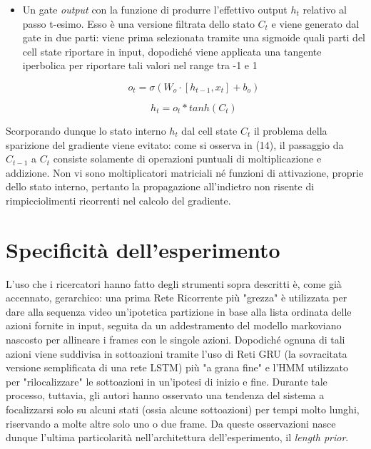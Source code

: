 \documentclass[10pt,letterpaper]{article}
\begin{document}
\begin{itemize}
\item Un gate \textit{output} con la funzione di produrre l'effettivo output $h_t$ relativo al passo t-esimo. Esso è una versione filtrata dello stato $C_t$ e viene generato dal gate in due parti: viene prima selezionata tramite una sigmoide quali parti del cell state riportare in input, dopodiché viene applicata una tangente iperbolica per riportare tali valori nel range tra -1 e 1

\begin{equation}
o_t = \sigma(W_o \cdot [h_{t-1},x_t] + b_o)
\end{equation}

\begin{equation}
h_t = o_t * tanh(C_t)
\end{equation}

\end{itemize}

Scorporando dunque lo stato interno $h_t$ dal cell state $C_t$ il problema della sparizione del gradiente viene evitato: come si osserva in (14), il passaggio da $C_{t-1}$ a $C_t$ consiste solamente di operazioni puntuali di moltiplicazione e addizione. Non vi sono moltiplicatori matriciali né funzioni di attivazione, proprie dello stato interno, pertanto la propagazione all'indietro non risente di rimpicciolimenti ricorrenti nel calcolo del gradiente.

\newpage
\section{Specificità dell'esperimento}

L'uso che i ricercatori hanno fatto degli strumenti sopra descritti è, come già accennato, gerarchico: una prima Rete Ricorrente più "grezza" è utilizzata per dare alla sequenza video un'ipotetica partizione in base alla lista ordinata delle azioni fornite in input, seguita da un addestramento del modello markoviano nascosto per allineare i frames con le singole azioni. Dopodiché ognuna di tali azioni viene suddivisa in sottoazioni tramite l'uso di Reti GRU (la sovracitata versione semplificata di una rete LSTM) più "a grana fine" e l'HMM utilizzato per "rilocalizzare" le sottoazioni in un'ipotesi di inizio e fine. Durante tale processo, tuttavia, gli autori hanno osservato una tendenza del sistema a focalizzarsi solo su alcuni stati (ossia alcune sottoazioni) per tempi molto lunghi, riservando a molte altre solo uno o due frame. Da queste osservazioni nasce dunque l'ultima particolarità nell'architettura dell'esperimento, il \textit{length prior}.
\end{document}
